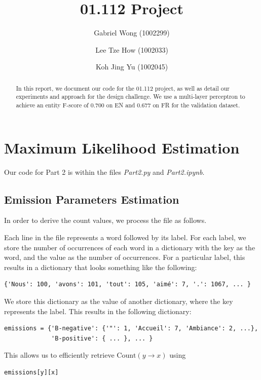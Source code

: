 \documentclass{article}
\title{01.112 Project}
\author{Gabriel Wong (1002299)
\and Lee Tze How (1002033) \and Koh Jing Yu (1002045)}
\numberwithin{equation}{section}
\begin{document}
\maketitle
\begin{abstract}
In this report, we document our code for the 01.112 project, as well as detail our experiments and approach for the design challenge. We use a multi-layer perceptron to achieve an entity F-score of 0.700 on EN and 0.677 on FR for the validation dataset.
\end{abstract}

\tableofcontents
\pagebreak

\setcounter{section}{1}

\section{Maximum Likelihood Estimation}
Our code for Part 2 is within the files \textit{Part2.py} and \textit{Part2.ipynb}.

\subsection{Emission Parameters Estimation} \label{sec:emissions}
In order to derive the count values, we process the file as follows.

Each line in the file represents a word followed by its label. For each label, we store the number of occurrences of each word in a dictionary with the key as the word, and the value as the number of occurrences. For a particular label, this results in a dictionary that looks something like the following:

\begin{verbatim}
{'Nous': 100, 'avons': 101, 'tout': 105, 'aimé': 7, '.': 1067, ... }
\end{verbatim}

We store this dictionary as the value of another dictionary, where the key represents the label. This results in the following dictionary:

\begin{verbatim}
emissions = {'B-negative': {'"': 1, 'Accueil': 7, 'Ambiance': 2, ...},
             'B-positive': { ... }, ... }
\end{verbatim}

This allows us to efficiently retrieve $\text{Count}(y \rightarrow x)$ using

\begin{verbatim}emissions[y][x]\end{verbatim}
\end{document}
